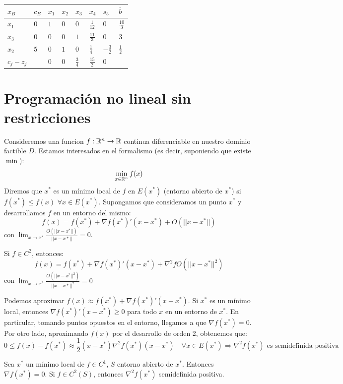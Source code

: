\documentclass[PM.tex]{subfiles}
\begin{document}
\begin{example}
\begin{tabular}{|l|l|l|l|l|l|l|l|}
\hline
	$x_B$ & $c_B$ & $x_1$ & $x_2$ & $x_3$ & $x_4$ & $s_5$ & $\overline{b}$\\
\hline
	$x_1$ & $0$ & $1$ & $0$ & $0$ & $\frac{1}{12}$ & $0$ & $\frac{10}{3}$\\
	$x_3$ & $0$ & $0$ & $0$ & $1$ & $\frac{11}{3}$ & $0$ & $3$\\
	$x_2$ & $5$ & $0$ & $1$ & $0$ & $\frac{1}{4}$ & $-\frac{3}{2}$ & $\frac{1}{2}$\\
\hline
	$c_j-z_j$ & & $0$ & $0$ & $\frac{3}{4}$ & $\frac{15}{2}$ & $0$ & \\
\hline
\end{tabular}
\end{example}


\chapter{Programación no lineal sin restricciones}
Consideremos una funcion $f : \mathbb{R}^n \to \mathbb{R}$ continua diferenciable en nuestro dominio factible $D$. Estamos interesados en el formalismo (es decir, suponiendo que existe $\min$):
\[ \min_{x \in \mathbb{R}^n} f(x)\]
Diremos que $x^*$ es un mínimo local de $f$ en $E(x^*)$ (entorno abierto de $x^*$) si $f(x^*) ≤ f(x)$ $\forall x \in E(x^*)$.
Supongamos que consideramos un punto $x^*$ y desarrollamos $f$ en un entorno del mismo:
\[ f(x) = f(x^*) +  \nabla f(x^*)'(x-x^*) + O(||{x-x^*}||) \]
con $\lim_{x \to x^*} \frac{O(||{x-x^*}||)}{||{x-x*}||} = 0$.

Si $f \in C^2$, entonces:
\[ f(x) = f(x^*) +  \nabla f(x^*)'(x-x^*) + \nabla^2 f O(||{x-x^*}||^2) \]
con $\lim_{x \to x^*} \frac{O(||{x-x^*}||^2)}{||{x-x*}||^2} = 0$

Podemos aproximar $f(x) \approx f(x^*) + \nabla f(x^*)'(x-x^*)$. Si $x^*$ es un mínimo local, entonces $\nabla f(x^*)'(x-x^*) ≥ 0$ para todo $x$ en un entorno de $x^*$. En particular, tomando puntos opuestos en el entorno, llegamos a que  $\nabla f(x^*) = 0$. Por otro lado, aproximando $f(x)$ por el desarrollo de orden 2, obtenemos que:
\[ 0 ≤ f(x) - f(x^*) \approx \frac{1}{2}(x-x^*) \nabla^2 f(x^*) (x-x^*) \quad \forall x \in E(x^*)  \Rightarrow \nabla^2 f(x^*)\text{ es semidefinida positiva}\]

\begin{theorem} Sea $x^*$ un mínimo local de $f \in C^1$, $S$ entorno abierto de $x^*$. Entonces $\nabla f(x^*) = 0$. Si $f \in C^2(S)$, entonces $\nabla^2 f(x^*)$ semidefinida positiva.
\end{theorem}
\end{document}
